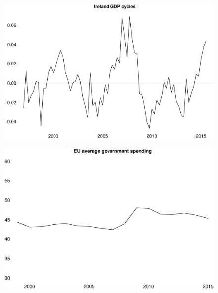 \documentclass{beamer}
\begin{document}
\begin{frame}
  \begin{figure}
    \includegraphics[scale=.25]{ire_gdp_hp.eps}
  \end{figure}
\end{frame}

\begin{frame}
  \begin{figure}
    \includegraphics[scale=.2]{eu_G.eps}
  \end{figure}
\end{frame}
\end{document}
